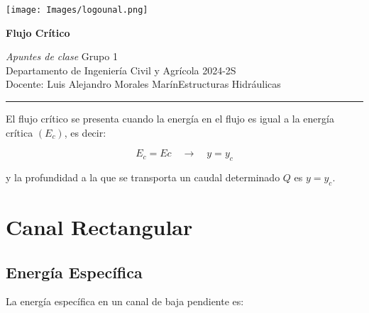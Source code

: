 \documentclass[a4paper, 11pt]{article}
\begin{document}
\renewcommand{\theenumi}{\alph{enumi})}
\noindent

\begin{minipage}{3.5cm}
    \texttt{[image: Images/logounal.png]} %
\end{minipage} 
\hspace{10pt}
\begin{minipage}{0.75\textwidth}

    {\Large \textbf{Flujo Crítico} \hspace{6cm} \textbf{}}\vspace{1ex}
    
    \textit{Apuntes de clase}\hspace{8.25cm} Grupo 1\\
    \normalsize Departamento de Ingeniería Civil y Agrícola \hspace{3.6cm} 2024-2S\\
    Docente: Luis Alejandro Morales Marín\hspace{1.9cm}Estructuras Hidráulicas\\
    \noindent\rule{5in}{2.8pt}
\end{minipage} \vspace{10pt} 



\vspace{1ex}

El flujo crítico se presenta cuando la energía en el flujo es igual a la energía crítica $(E_c)$, es decir:

\begin{equation}
    E_c=Ec \quad \rightarrow \quad y=y_c
    \nonumber
\end{equation}

y la profundidad a la que se transporta un caudal determinado $Q$ es $y=y_c$.

\section{Canal Rectangular}

\subsection{Energía Específica}

La energía específica en un canal de baja pendiente es:
\end{document}
